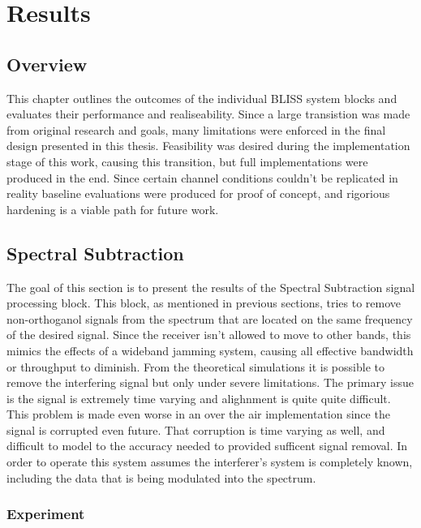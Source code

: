 \chapter{Results}
\label{ch:results}

\section{Overview}

This chapter outlines the outcomes of the individual BLISS system blocks and evaluates their performance and realiseability.  Since a large transistion was made from original research and goals, many limitations were enforced in the final design presented in this thesis.  Feasibility was desired during the implementation stage of this work, causing this transition, but full implementations were produced in the end.  Since certain channel conditions couldn't be replicated in reality baseline evaluations were produced for proof of concept, and rigorious hardening is a viable path for future work.\\ 

\section{Spectral Subtraction}

The goal of this section is to present the results of the Spectral Subtraction signal processing block.  This block, as mentioned in previous sections, tries to remove non-orthoganol signals from the spectrum that are located on the same frequency of the desired signal.  Since the receiver isn't allowed to move to other bands, this mimics the effects of a wideband jamming system, causing all effective bandwidth or throughput to diminish.  From the theoretical simulations it is possible to remove the interfering signal but only under severe limitations.  The primary issue is the signal is extremely time varying and alighnment is quite quite difficult.  This problem is made even worse in an over the air implementation since the signal is corrupted even future.  That corruption is time varying as well, and difficult to model to the accuracy needed to provided sufficent signal removal.  In order to operate this system assumes the interferer's system is completely known, including the data that is being modulated into the spectrum.\\

\subsection{Experiment}

